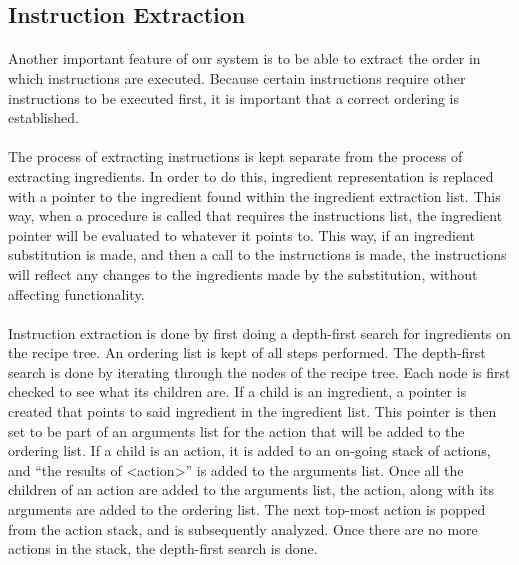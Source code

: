 \subsection{Instruction Extraction}
\paragraph{}
Another important feature of our system is to be able to extract the order in which instructions are executed. Because certain instructions require other instructions to be executed first, it is important that a correct ordering is established.

\paragraph{}
The process of extracting instructions is kept separate from the process of extracting ingredients. In order to do this, ingredient representation is replaced with a pointer to the ingredient found within the ingredient extraction list. This way, when a procedure is called that requires the instructions list, the ingredient pointer will be evaluated to whatever it points to. This way, if an ingredient substitution is made, and then a call to the instructions is made, the instructions will reflect any changes to the ingredients made by the substitution, without affecting functionality.

\paragraph{}
Instruction extraction is done by first doing a depth-first search for ingredients on the recipe tree. An ordering list is kept of all steps performed. The depth-first search is done by iterating through the nodes of the recipe tree. Each node is first checked to see what its children are. If a child is an ingredient, a pointer is created that points to said ingredient in the ingredient list. This pointer is then set to be part of an arguments list for the action that will be added to the ordering list. If a child is an action, it is added to an on-going stack of actions, and ``the results of <action>'' is added to the arguments list. Once all the children of an action are added to the arguments list, the action, along with its arguments are added to the ordering list. The next top-most action is popped from the action stack, and is subsequently analyzed. Once there are no more actions in the stack, the depth-first search is done.

